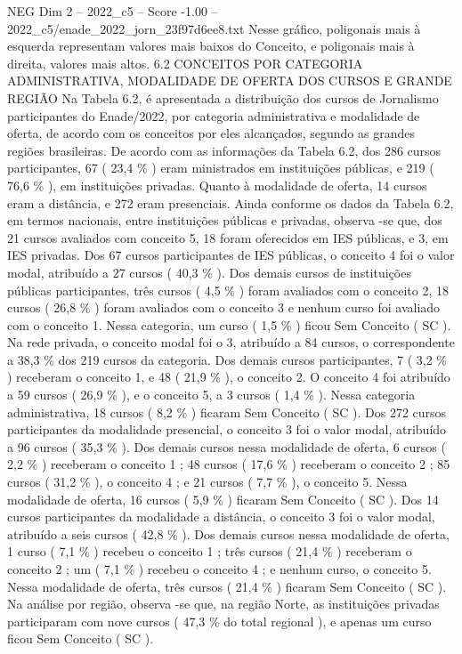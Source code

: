 \begin{textsample}{NEG Dim 2 – 2022\_c5 – Score -1.00 – 2022\_c5/enade\_2022\_jorn\_23f97d6ee8.txt}
Nesse gráfico, poligonais mais à esquerda representam valores mais baixos do Conceito, e poligonais mais à direita, valores mais altos. 6.2 CONCEITOS POR CATEGORIA ADMINISTRATIVA, MODALIDADE DE OFERTA DOS CURSOS E GRANDE REGIÃO Na Tabela 6.2, é apresentada a distribuição dos cursos de Jornalismo participantes do Enade/2022, por categoria administrativa e modalidade de oferta, de acordo com os conceitos por eles alcançados, segundo as grandes regiões brasileiras.
De acordo com as informações da Tabela 6.2, dos 286 cursos participantes, 67 ( 23,4 \% ) eram ministrados em instituições públicas, e 219 ( 76,6 \% ), em instituições privadas.
Quanto à modalidade de oferta, 14 cursos eram a distância, e 272 eram presenciais.
Ainda conforme os dados da Tabela 6.2, em termos nacionais, entre instituições públicas e privadas, observa -se que, dos 21 cursos avaliados com conceito 5, 18 foram oferecidos em IES públicas, e 3, em IES privadas.
Dos 67 cursos participantes de IES públicas, o conceito 4 foi o valor modal, atribuído a 27 cursos ( 40,3 \% ).
Dos demais cursos de instituições públicas participantes, três cursos ( 4,5 \% ) foram avaliados com o conceito 2, 18 cursos ( 26,8 \% ) foram avaliados com o conceito 3 e nenhum curso foi avaliado com o conceito 1.
Nessa categoria, um curso ( 1,5 \% ) ficou Sem Conceito ( SC ).
Na rede privada, o conceito modal foi o 3, atribuído a 84 cursos, o correspondente a 38,3 \% dos 219 cursos da categoria.
Dos demais cursos participantes, 7 ( 3,2 \% ) receberam o conceito 1, e 48 ( 21,9 \% ), o conceito 2.
O conceito 4 foi atribuído a 59 cursos ( 26,9 \% ), e o conceito 5, a 3 cursos ( 1,4 \% ).
Nessa categoria administrativa, 18 cursos ( 8,2 \% ) ficaram Sem Conceito ( SC ).
Dos 272 cursos participantes da modalidade presencial, o conceito 3 foi o valor modal, atribuído a 96 cursos ( 35,3 \% ).
Dos demais cursos nessa modalidade de oferta, 6 cursos ( 2,2 \% ) receberam o conceito 1 ; 48 cursos ( 17,6 \% ) receberam o conceito 2 ; 85 cursos ( 31,2 \% ), o conceito 4 ; e 21 cursos ( 7,7 \% ), o conceito 5.
Nessa modalidade de oferta, 16 cursos ( 5,9 \% ) ficaram Sem Conceito ( SC ).
Dos 14 cursos participantes da modalidade a distância, o conceito 3 foi o valor modal, atribuído a seis cursos ( 42,8 \% ).
Dos demais cursos nessa modalidade de oferta, 1 curso ( 7,1 \% ) recebeu o conceito 1 ; três cursos ( 21,4 \% ) receberam o conceito 2 ; um ( 7,1 \% ) recebeu o conceito 4 ; e nenhum curso, o conceito 5.
Nessa modalidade de oferta, três cursos ( 21,4 \% ) ficaram Sem Conceito ( SC ).
Na análise por região, observa -se que, na região Norte, as instituições privadas participaram com nove cursos ( 47,3 \% do total regional ), e apenas um curso ficou Sem Conceito ( SC ).

\end{textsample}
